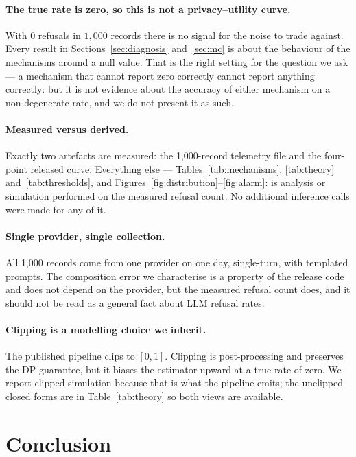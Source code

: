 \documentclass[journal]{IEEEtran}
\theoremstyle{definition}
\newcommand{\Nrec}{1{,}000}
\newcommand{\Nrefused}{0}
\begin{document}
\paragraph{The true rate is zero, so this is not a privacy--utility curve.}
With $\Nrefused{}$ refusals in $\Nrec{}$ records there is no signal for the noise
to trade against. Every result in Sections~\ref{sec:diagnosis}
and~\ref{sec:mc} is about the behaviour of the mechanisms around a null value.
That is the right setting for the question we ask --- a mechanism that cannot
report zero correctly cannot report anything correctly: but it is not evidence
about the accuracy of either mechanism on a non-degenerate rate, and we do not
present it as such.

\paragraph{Measured versus derived.}
Exactly two artefacts are measured: the \Nrec-record telemetry file and the
four-point released curve. Everything else --- Tables~\ref{tab:mechanisms},
\ref{tab:theory} and~\ref{tab:thresholds}, and
Figures~\ref{fig:distribution}--\ref{fig:alarm}: is analysis or simulation
performed on the measured refusal count. No additional inference calls were made
for any of it.\paragraph{Single provider, single collection.}
All \Nrec{} records come from one provider on one day, single-turn, with
templated prompts. The composition error we characterise is a property of the
release code and does not depend on the provider, but the measured refusal count
does, and it should not be read as a general fact about LLM refusal rates.

\paragraph{Clipping is a modelling choice we inherit.}
The published pipeline clips to $[0,1]$. Clipping is post-processing and preserves
the DP guarantee, but it biases the estimator upward at a true rate of zero. We
report clipped simulation because that is what the pipeline emits; the unclipped
closed forms are in Table~\ref{tab:theory} so both views are available.

\section{Conclusion}
\end{document}
